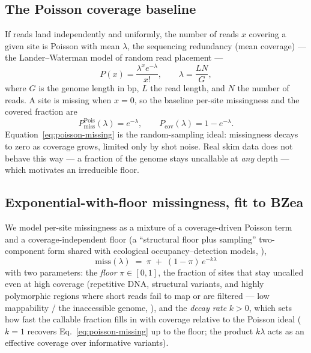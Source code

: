 \documentclass[11pt]{article}
\newcommand{\miss}{\mathrm{miss}}
\newcommand{\cov}{\lambda}                          %
\begin{document}
\subsection{The Poisson coverage baseline}
\label{sec:poisson}

If reads land independently and uniformly, the number of reads $x$ covering a
given site is Poisson with mean $\cov$, the sequencing redundancy (mean coverage)
--- the Lander--Waterman model of random read placement \citep{lander_waterman_1988,sims_2014} ---
\begin{equation}
P(x) = \frac{\cov^{x} e^{-\cov}}{x!},
\qquad \cov = \frac{L N}{G},
\label{eq:poisson}
\end{equation}
where $G$ is the genome length in bp, $L$ the read length, and $N$ the number of
reads. A site is missing when $x=0$, so the baseline per-site missingness and the
covered fraction are
\begin{equation}
P_{\miss}^{\mathrm{Pois}}(\cov) = e^{-\cov},
\qquad
P_{\mathrm{cov}}(\cov) = 1 - e^{-\cov}.
\label{eq:poisson-missing}
\end{equation}
Equation~\eqref{eq:poisson-missing} is the random-sampling ideal: missingness
decays to zero as coverage grows, limited only by shot noise. Real skim data does
not behave this way --- a fraction of the genome stays uncallable at \emph{any}
depth --- which motivates an irreducible floor.

\subsection{Exponential-with-floor missingness, fit to BZea}
\label{sec:floor}

We model per-site missingness as a mixture of a coverage-driven Poisson term and a
coverage-independent floor (a ``structural floor plus sampling'' two-component form
shared with ecological occupancy--detection models, \citealp{mackenzie_2002}),
\begin{equation}
\boxed{\;\miss(\cov) \;=\; \pi \;+\; (1-\pi)\,e^{-k\cov}\;}
\label{eq:floor}
\end{equation}
with two parameters: the \emph{floor} $\pi\in[0,1]$, the fraction of sites that
stay uncalled even at high coverage (repetitive DNA, structural variants, and
highly polymorphic regions where short reads fail to map or are filtered ---
low mappability / the inaccessible genome, \citealp{li_maq_2008,derrien_2012,tgp_2015}),
and the
\emph{decay rate} $k>0$, which sets how fast the callable fraction fills in with
coverage relative to the Poisson ideal ($k=1$ recovers
Eq.~\eqref{eq:poisson-missing} up to the floor; the product $k\cov$ acts as an
effective coverage over informative variants).
\end{document}
